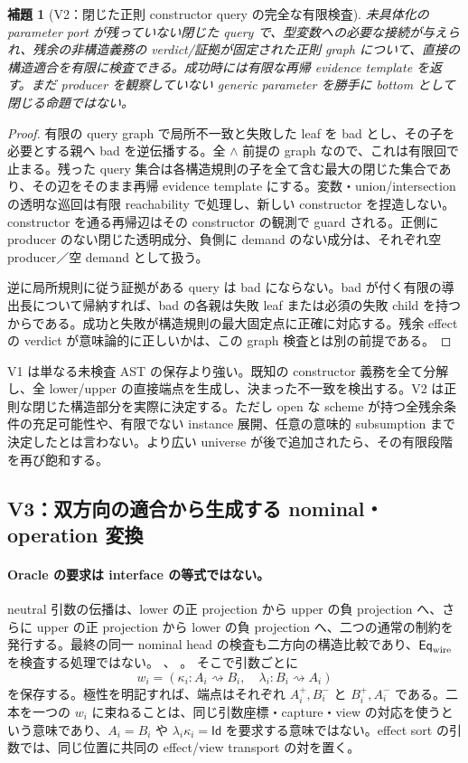 \documentclass[11pt,a4paper]{article}
\newtheorem{lemma}[theorem]{補題}
\theoremstyle{remark}
\newcommand{\adap}{\rightsquigarrow}
\newcommand{\src}[2]{\href{https://github.com/momota1029/yulang/blob/a58eefc31e22141574b6f20c6a5748151c6d79f1/#1}{\detokenize{#2}}}
\begin{document}
\begin{lemma}[V2：閉じた正則 constructor query の完全な有限検査]
未具体化の parameter port が残っていない閉じた query で、型変数への必要な接続が与えられ、残余の非構造義務の verdict/証拠が固定された正則 graph について、直接の構造適合を有限に検査できる。成功時には有限な再帰 evidence template を返す。まだ producer を観察していない generic parameter を勝手に bottom として閉じる命題ではない。
\end{lemma}
\begin{proof}
有限の query graph で局所不一致と失敗した leaf を bad とし、その子を必要とする親へ bad を逆伝播する。全 $\wedge$ 前提の graph なので、これは有限回で止まる。残った query 集合は各構造規則の子を全て含む最大の閉じた集合であり、その辺をそのまま再帰 evidence template にする。変数・union/intersection の透明な巡回は有限 reachability で処理し、新しい constructor を捏造しない。constructor を通る再帰辺はその constructor の観測で guard される。正側に producer のない閉じた透明成分、負側に demand のない成分は、それぞれ空 producer／空 demand として扱う。

逆に局所規則に従う証拠がある query は bad にならない。bad が付く有限の導出長について帰納すれば、bad の各親は失敗 leaf または必須の失敗 child を持つからである。成功と失敗が構造規則の最大固定点に正確に対応する。残余 effect の verdict が意味論的に正しいかは、この graph 検査とは別の前提である。
\end{proof}

V1 は単なる未検査 AST の保存より強い。既知の constructor 義務を全て分解し、全 lower/upper の直接端点を生成し、決まった不一致を検出する。V2 は正則な閉じた構造部分を実際に決定する。ただし open な scheme が持つ全残余条件の充足可能性や、有限でない instance 展開、任意の意味的 subsumption まで決定したとは言わない。より広い universe が後で追加されたら、その有限段階を再び飽和する。

\subsection{V3：双方向の適合から生成する nominal・operation 変換}
\label{sec:nominal-bimap}

\paragraph{Oracle の要求は interface の等式ではない。}
neutral 引数の伝播は、lower の正 projection から upper の負 projection へ、さらに upper の正 projection から lower の負 projection へ、二つの通常の制約を発行する。最終の同一 nominal head の検査も二方向の構造比較であり、$\mathsf{Eq}_{\rm wire}$ を検査する処理ではない。
\src{crates/infer/src/constraints/machine/propagate.rs\#L412-L443}{neutral 引数の二方向伝播}、
\src{crates/specialize/src/specialize2/type_graph.rs\#L663-L705}{同じ nominal head の最終比較}。
そこで引数ごとに
\[
 w_i=(\kappa_i:A_i\adap B_i,\quad
      \lambda_i:B_i\adap A_i)
\]
を保存する。極性を明記すれば、端点はそれぞれ $A_i^+,B_i^-$ と $B_i^+,A_i^-$ である。二本を一つの $w_i$ に束ねることは、同じ引数座標・capture・view の対応を使うという意味であり、$A_i=B_i$ や $\lambda_i\kappa_i=\mathsf{Id}$ を要求する意味ではない。effect sort の引数では、同じ位置に共同の effect/view transport の対を置く。
\end{document}
